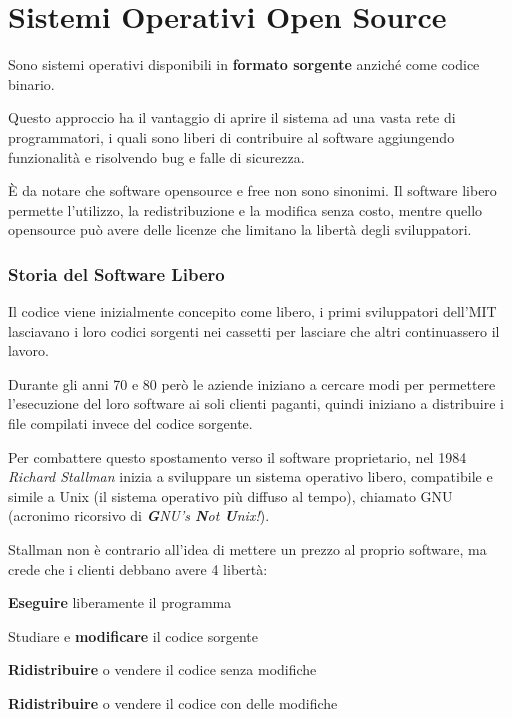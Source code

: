 \section{Sistemi Operativi Open Source}
Sono sistemi operativi disponibili in \textbf{formato sorgente} anziché come codice binario.

Questo approccio ha il vantaggio di aprire il sistema ad una vasta rete di programmatori, i quali sono liberi di contribuire al software aggiungendo funzionalità e risolvendo bug e falle di sicurezza.

\begin{note}
    È da notare che software opensource e free non sono sinonimi. Il software libero permette l'utilizzo, la redistribuzione e la modifica senza costo, mentre quello opensource può avere delle licenze che limitano la libertà degli sviluppatori.
\end{note}

\subsubsection*{Storia del Software Libero}
Il codice viene inizialmente concepito come libero, i primi sviluppatori dell'MIT lasciavano i loro codici sorgenti nei cassetti per lasciare che altri continuassero il lavoro.

\spacer
Durante gli anni 70 e 80 però le aziende iniziano a cercare modi per permettere l'esecuzione del loro software ai soli clienti paganti, quindi iniziano a distribuire i file compilati invece del codice sorgente.

\spacer
Per combattere questo spostamento verso il software proprietario, nel 1984 \textit{Richard Stallman} inizia a sviluppare un sistema operativo libero, compatibile e simile a Unix (il sistema operativo più diffuso al tempo), chiamato GNU (acronimo ricorsivo di \textit{\textbf{G}NU's \textbf{N}ot \textbf{U}nix!}).

\spacer
Stallman non è contrario all'idea di mettere un prezzo al proprio software, ma crede che i clienti debbano avere 4 libertà:
\begin{sitemize}
    \item \textbf{Eseguire} liberamente il programma
    \item Studiare e \textbf{modificare} il codice sorgente
    \item \textbf{Ridistribuire} o vendere il codice senza modifiche
    \item \textbf{Ridistribuire} o vendere il codice con delle modifiche
\end{sitemize}

